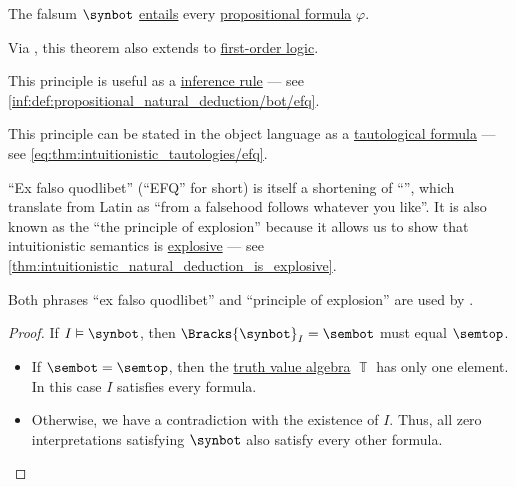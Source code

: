\begin{theorem}\label{thm:propositional_semantic_efq}
  The falsum \( \synbot \) \hyperref[def:propositional_semantics/entailment]{entails} every \hyperref[def:propositional_formula]{propositional formula} \( \varphi \).
\end{theorem}
\begin{comments}
  \item Via , this theorem also extends to \hyperref[def:first_order_logic]{first-order logic}.

  \item This principle is useful as a \hyperref[def:inference_rule]{inference rule} --- see \ref{inf:def:propositional_natural_deduction/bot/efq}.

  \item This principle can be stated in the object language as a \hyperref[def:tautology]{tautological formula} --- see \eqref{eq:thm:intuitionistic_tautologies/efq}.

  \item \enquote{Ex falso quodlibet} (\enquote{EFQ} for short) is itself a shortening of \enquote{}, which \textcite[35]{TroelstraSchwichtenberg2000BasicProofTheory} translate from Latin as \enquote{from a falsehood follows whatever you like}. It is also known as the \enquote{the principle of explosion} because it allows us to show that intuitionistic semantics is \hyperref[def:paraconsistent_consequence_operator]{explosive} --- see \cref{thm:intuitionistic_natural_deduction_is_explosive}.

  Both phrases \enquote{ex falso quodlibet} and \enquote{principle of explosion} are used by \textcite[47]{Mimram2020ProgramEqualsProof}.
\end{comments}
\begin{proof}
  If \( I \vDash \synbot \), then \( \Bracks{\synbot}_I = \sembot \) must equal \( \semtop \).

  \begin{itemize}
    \item If \( \sembot = \semtop \), then the \hyperref[def:truth_value_algebra]{truth value algebra} \( \BbbT \) has only one element. In this case \( I \) satisfies every formula.

    \item Otherwise, we have a contradiction with the existence of \( I \). Thus, all zero interpretations satisfying \( \synbot \) also satisfy every other formula.
  \end{itemize}
\end{proof}


